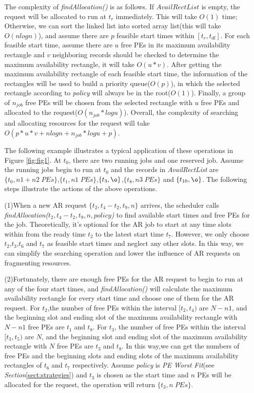 \documentclass[preprint,12pt]{elsarticle}
\begin{document}
The complexity of \emph{findAllocation()} is as follows. If $AvailRectList$ is empty, the request will be allocated to run at $t_r$ immediately. This will take $O(1)$ time; Otherwise, we can sort the linked list into sorted array list(this will take $O(nlogn)$), and assume there are $p$ feasible start times within $[t_r,t_{dl}]$. For each feasible start time, assume there are $u$ free PEs in its maximum availability rectangle and $v$ neighboring records should be checked to determine the maximum availability rectangle, it will take $O(u*v)$. After getting the maximum availability rectangle of each feasible start time, the information of the rectangles will be used to build a priority queue($O(p)$), in which the selected rectangle according to \emph{policy} will always be in the root($O(1)$). Finally, a group of $n_{job}$ free PEs will be chosen from the selected rectangle
with $u$ free PEs and allocated to the request($O(n_{job}*logu)$). Overall, the complexity of searching and allocating resources for the request will take  $O(p*u*v+nlogn+n_{job}*logu+p)$.

The following example illustrates a typical application of these operations in Figure \ref{fig:fig1}. At $t_0$, there are two running jobs and one reserved job. Assume the running jobs begin to run at $t_0$ and the records in \emph{AvailRectList} are $\{t_0,n1+n2\; PEs\}$,$\{t_1,n1\;PEs \}$,$\{t_3,\o\}$,$\{t_8,n3\;PEs\}$ and $\{t_{10},\o\}$. The following steps illustrate the actions of the above operations.

(1)When a new AR request $\{t_2,t_4-t_2,t_9,n\}$ arrives, the scheduler calls \emph{findAllocation($t_2,t_4-t_2,t_9,n,policy$)} to find available start times and free PEs for the job. Theoretically, it's optional for the AR job to start at any time slots within from the ready time $t_2$ to the latest start time $t_7$. However, we only choose $t_2$,$t_3$,$t_6$ and $t_7$ as feasible start times and neglect any other slots. In this way, we can simplify the searching operation and lower the influence of AR requests on fragmenting resources.

(2)Fortunately, there are enough free PEs for the AR request to begin to run at any of the four start times, and \emph{findAllocation()} will calculate the maximum availability rectangle for every start time and choose one of them for the AR request. For $t_2$,the number of free PEs within the interval $[t_2,t_4)$ are $N-n1$, and the beginning slot and ending slot of the maximum availability rectangle with $N-n1$ free PEs are $t_1$ and $t_8$. For $t_3$, the number of free PEs within the interval $[t_3,t_5)$ are $N$, and the beginning slot and ending slot of the maximum availability rectangle with $N$ free PEs are $t_3$ and $t_8$. In this way,we can get the numbers of free PEs and the beginning slots and ending slots of the maximum availability rectangles of $t_6$ and $t_7$ respectively. Assume \emph{policy} is \emph{PE Worst Fit}(see \emph{Section}\ref{sect:strategies}) and $t_3$ is chosen as the start time and $n$ PEs will be allocated for the request, the operation will return $\{t_3, n \;PEs \}$.
\end{document}

